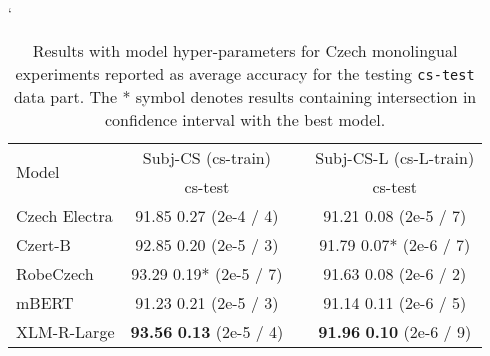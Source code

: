 \documentclass[10pt, a4paper]{article}
\begin{document}
\begin{table}[H]
\catcode`
\begin{adjustbox}{width=1\linewidth,center}
\begin{tabular}{lccc} \toprule
 \multirow{2}{*}{Model}                       & \multicolumn{1}{c}{Subj-CS (cs-train)}  &   & \multicolumn{1}{c}{Subj-CS-L (cs-L-train)}                                  \\ \cline{2-2} \cline{4-4} 
        & \multicolumn{1}{c}{cs-test}  &       & \multicolumn{1}{c}{cs-test}     \\ \midrule
Czech Electra & 91.85  0.27\phantom{*} \footnotesize{(2e-4 / 4)}  & & 91.21  0.08\phantom{*} \footnotesize{(2e-5 / 7)} \\
Czert-B    & 92.85  0.20\phantom{*} \footnotesize{(2e-5 / 3)}  & & 91.79  0.07* \footnotesize{(2e-6 / 7)} \\
RobeCzech    & 93.29  0.19* \footnotesize{(2e-5 / 7)}   & & 91.63  0.08\phantom{*} \footnotesize{(2e-6 / 2)} \\
mBERT        & 91.23  0.21\phantom{*} \footnotesize{(2e-5 / 3)}  & & 91.14  0.11\phantom{*} \footnotesize{(2e-6 / 5)} \\
XLM-R-Large  & \textbf{93.56}  \textbf{0.13}\phantom{*} \footnotesize{(2e-5 / 4)}  & & \textbf{91.96}  \textbf{0.10\phantom{*}} \footnotesize{(2e-6 / 9)} \\ \bottomrule
\end{tabular}
\end{adjustbox}
\caption{Results with model hyper-parameters for Czech monolingual experiments reported as average accuracy for the testing \texttt{cs-test} data part. The * symbol denotes results containing intersection in confidence interval with the best model.} \label{tab:hyper-monolingual-cs}
\end{table}
\end{document}
